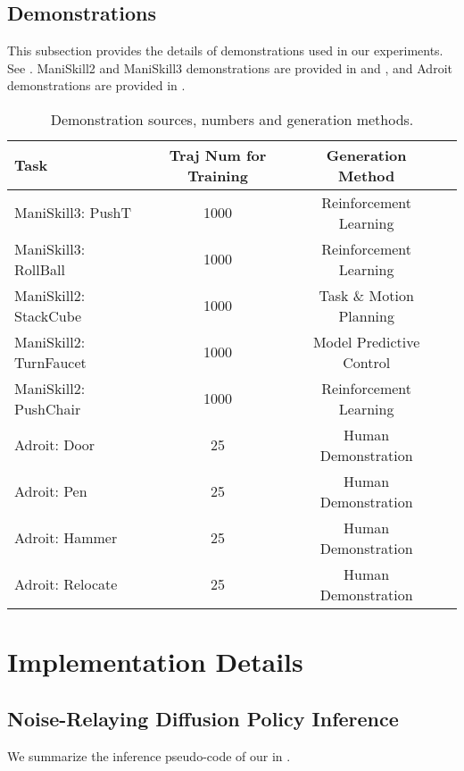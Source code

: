 \subsection{Demonstrations}
This subsection provides the details of demonstrations used in our experiments. See . ManiSkill2 and ManiSkill3 demonstrations are provided in \cite{gu2023maniskill2} and \cite{tao2024maniskill3}, and Adroit demonstrations are provided in \cite{rajeswaran2017learning}.

\begin{table}[!ht]
\caption{Demonstration sources, numbers and generation methods.}
\label{table:demonstrations}
\setlength{\tabcolsep}{3.5pt}
\begin{center}
{{
\begin{tabular}{lccc}
\toprule[1pt]
\textbf{Task}
& \textbf{Traj Num for Training}
& \textbf{Generation Method}
\\
\midrule
ManiSkill3: PushT      & 1000 & Reinforcement Learning \\
ManiSkill3: RollBall   & 1000 & Reinforcement Learning \\
ManiSkill2: StackCube  & 1000 & Task \& Motion Planning \\
ManiSkill2: TurnFaucet & 1000 & Model Predictive Control \\
ManiSkill2: PushChair  & 1000 & Reinforcement Learning \\
Adroit: Door       & 25   & Human Demonstration \\
Adroit: Pen        & 25   & Human Demonstration \\
Adroit: Hammer     & 25   & Human Demonstration \\
Adroit: Relocate   & 25   & Human Demonstration \\
\bottomrule[1pt]
\end{tabular}
}}
\end{center}
\vspace{-12pt}
\end{table}

\section{Implementation Details}
\label{sup:implementation_details}
\subsection{Noise-Relaying Diffusion Policy Inference}
\label{sup:algo}
We summarize the inference pseudo-code of our \ours in .

